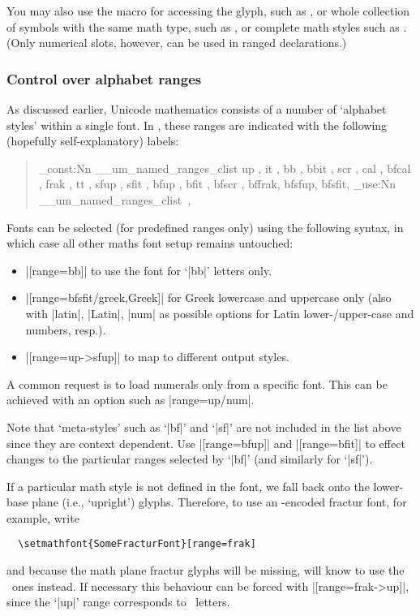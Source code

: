 You may also use the macro for accessing the glyph, such as , or whole collection of symbols with the same math type, such as , or complete math styles such as .
(Only numerical slots, however, can be used in ranged declarations.)

\subsubsection{Control over alphabet ranges}

As discussed earlier, Unicode mathematics consists of a number of `alphabet styles' within a single font. In , these ranges are indicated with the following (hopefully self-explanatory) labels:
\begin{quote}\ttfamily
\ExplSyntaxOn
\clist_const:Nn \g__um_named_ranges_clist {
up    ,
it    ,
bb    ,
bbit  ,
scr   ,
cal   ,
bfcal ,
frak  ,
tt    ,
sfup  ,
sfit  ,
bfup  ,
bfit  ,
bfscr ,
bffrak,
bfsfup,
bfsfit,
}
\clist_use:Nn \g__um_named_ranges_clist {\,,\,~}
\ExplSyntaxOff
\end{quote}
Fonts can be selected (for predefined ranges only) using the following syntax, in which case all other maths font setup remains untouched:
\begin{itemize}
\item |[range=bb]| to use the font for `|bb|' letters only.
\item |[range=bfsfit/{greek,Greek}]| for Greek lowercase and uppercase only (also with |latin|, |Latin|, |num| as possible options for Latin lower-/upper-case and numbers, resp.).
\item |[range=up->sfup]| to map to different output styles.
\end{itemize}

A common request is to load numerals only from a specific font. This can be
achieved with an option such as |range=up/{num}|.

Note that `meta-styles' such as `|bf|' and `|sf|' are not included in the list above since they are context dependent. Use |[range=bfup]| and |[range=bfit]| to effect changes to the particular ranges selected by `|bf|' (and similarly for `|sf|').

If a particular math style is not defined in the font, we fall back onto the lower-base plane (i.e., `upright') glyphs.
Therefore, to use an \ascii-encoded fractur font, for example, write
\begin{Verbatim}
  \setmathfont{SomeFracturFont}[range=frak]
\end{Verbatim}
and because the math plane fractur glyphs will be missing,  will know to use the \ascii\ ones instead.
If necessary this behaviour can be forced with |[range=frak->up]|, since the `|up|' range corresponds to \ascii\ letters.

